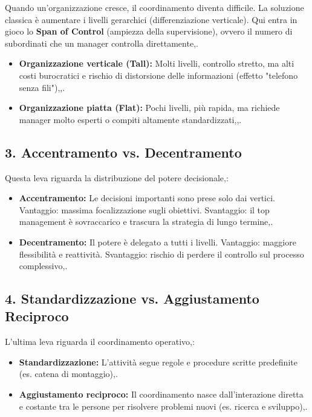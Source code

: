 \documentclass[a4paper,10pt]{article}
\begin{document}
Quando un'organizzazione cresce, il coordinamento diventa difficile. La soluzione classica è aumentare i livelli gerarchici (differenziazione verticale). Qui entra in gioco lo \textbf{Span of Control} (ampiezza della supervisione), ovvero il numero di subordinati che un manager controlla direttamente,.
\begin{itemize}
    \item \textbf{Organizzazione verticale (Tall):} Molti livelli, controllo stretto, ma alti costi burocratici e rischio di distorsione delle informazioni (effetto "telefono senza fili"),,.
    \item \textbf{Organizzazione piatta (Flat):} Pochi livelli, più rapida, ma richiede manager molto esperti o compiti altamente standardizzati,,.
\end{itemize}

\subsection*{3. Accentramento vs. Decentramento}

Questa leva riguarda la distribuzione del potere decisionale,:
\begin{itemize}
    \item \textbf{Accentramento:} Le decisioni importanti sono prese solo dai vertici. Vantaggio: massima focalizzazione sugli obiettivi. Svantaggio: il top management è sovraccarico e trascura la strategia di lungo termine,.
    \item \textbf{Decentramento:} Il potere è delegato a tutti i livelli. Vantaggio: maggiore flessibilità e reattività. Svantaggio: rischio di perdere il controllo sul processo complessivo,.
\end{itemize}

\subsection*{4. Standardizzazione vs. Aggiustamento Reciproco}

L'ultima leva riguarda il coordinamento operativo,:
\begin{itemize}
    \item \textbf{Standardizzazione:} L'attività segue regole e procedure scritte predefinite (es. catena di montaggio),.
    \item \textbf{Aggiustamento reciproco:} Il coordinamento nasce dall'interazione diretta e costante tra le persone per risolvere problemi nuovi (es. ricerca e sviluppo),.
\end{itemize}
\end{document}
